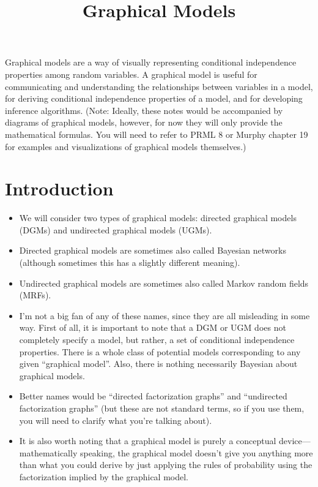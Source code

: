 \documentclass[12pt]{article}
\title{Graphical Models}
\author{}
\date{}
\begin{document}
\maketitle

\tableofcontents


\vspace{2em}

Graphical models are a way of visually representing conditional independence properties among random variables. A graphical model is useful for communicating and understanding the relationships between variables in a model, for deriving conditional independence properties of a model, and for developing inference algorithms. (Note: Ideally, these notes would be accompanied by diagrams of graphical models, however, for now they will only provide the mathematical formulas. You will need to refer to PRML 8 or Murphy chapter 19 for examples and visualizations of graphical models themselves.)

\newpage

\section{Introduction}

\begin{itemize}
\item We will consider two types of graphical models: directed graphical models (DGMs) and undirected graphical models (UGMs).
\item Directed graphical models are sometimes also called Bayesian networks (although sometimes this has a slightly different meaning).
\item Undirected graphical models are sometimes also called Markov random fields (MRFs).
\item I'm not a big fan of any of these names, since they are all misleading in some way. First of all, it is important to note that a DGM or UGM does not completely specify a model, but rather, a set of conditional independence properties. There is a whole class of potential models corresponding to any given ``graphical model''. Also, there is nothing necessarily Bayesian about graphical models.
\item Better names would be ``directed factorization graphs'' and ``undirected factorization graphs'' (but these are not standard terms, so if you use them, you will need to clarify what you're talking about).
\item It is also worth noting that a graphical model is purely a conceptual device---mathematically speaking, the graphical model doesn't give you anything more than what you could derive by just applying the rules of probability using the factorization implied by the graphical model.
\end{itemize}
\end{document}
